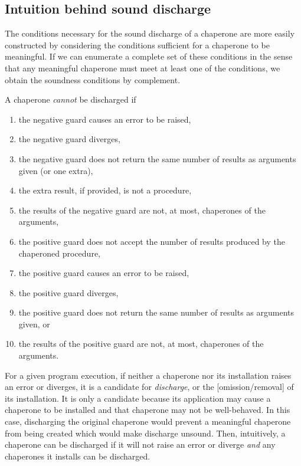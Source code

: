 \documentclass{sigplanconf}
\begin{document}
\subsection{Intuition behind sound discharge}

The conditions necessary for the sound discharge of a chaperone are more easily constructed by considering the conditions sufficient for a chaperone to be meaningful.
If we can enumerate a complete set of these conditions in the sense that any meaningful chaperone must meet at least one of the conditions, we obtain the soundness conditions by complement.

A chaperone \emph{cannot} be discharged if
\begin{enumerate}
\item the negative guard causes an error to be raised,
\item the negative guard diverges,
\item the negative guard does not return the same number of results as arguments given (or one extra),
\item the extra result, if provided, is not a procedure,
\item the results of the negative guard are not, at most, chaperones of the arguments,
\item the positive guard does not accept the number of results produced by the chaperoned procedure,
\item the positive guard causes an error to be raised,
\item the positive guard diverges,
\item the positive guard does not return the same number of results as arguments given, or
\item the results of the positive guard are not, at most, chaperones of the arguments.
\end{enumerate}

For a given program execution, if neither a chaperone nor its installation raises an error or diverges, it is a candidate for \emph{discharge}, or the [omission/removal] of its installation.
It is only a candidate because its application may cause a chaperone to be installed and that chaperone may not be well-behaved.
In this case, discharging the original chaperone would prevent a meaningful chaperone from being created which would make discharge unsound.
Then, intuitively, a chaperone can be discharged if it will not raise an error or diverge  \emph{and} any chaperones it installs can be discharged.
\end{document}
